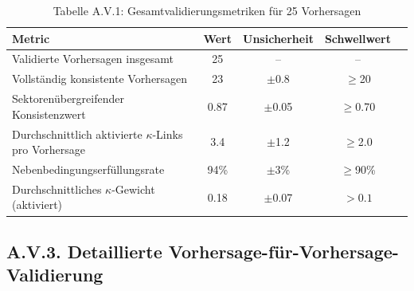 \documentclass[13pt,a4paper]{article}
\begin{document}
	\begin{table}[H]
		\centering
		\small
		\caption{Tabelle A.V.1: Gesamtvalidierungsmetriken für 25 Vorhersagen}
		\begin{tabular}{p{}cccc}
			\toprule
			\textbf{Metric} & \textbf{Wert} & \textbf{Unsicherheit} & \textbf{Schwellwert} \\
			\midrule
			Validierte Vorhersagen insgesamt & 25 & -- & -- \\
			Vollständig konsistente Vorhersagen & 23 & $\pm$0.8 & $\geq$20 \\
			Sektorenübergreifender Konsistenzwert & 0.87 & $\pm$0.05 & $\geq$0.70 \\
			Durchschnittlich aktivierte $\kappa$-Links pro Vorhersage & 3.4 & $\pm$1.2 & $\geq$2.0 \\
			Nebenbedingungserfüllungsrate & 94\% & $\pm$3\% & $\geq$90\% \\
			Durchschnittliches $\kappa$-Gewicht (aktiviert) & 0.18 & $\pm$0.07 & $>0.1$ \\
			\bottomrule
		\end{tabular}
		\label{tab:validation-summary}
	\end{table}
	
	\subsection*{A.V.3. Detaillierte Vorhersage-für-Vorhersage-Validierung}
	
\end{document}
